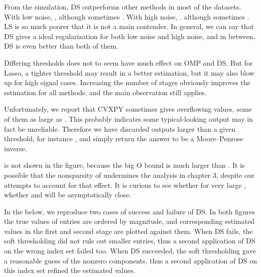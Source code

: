 \stopsubsection

\startsubsection [title={Discussion}]

From the simulation, DS outperforms other methods in most of the datasets.
With low noise, ,
although sometimes .
With high noise, .
although sometimes .
LS is so much poorer that it is not a main contender.
In general, we can say that DS gives a ideal regularization for both low noise and high noise, and in between, DS is even better than both of them.

Differing thresholds does not to seem have much effect on OMP and DS.
But for Lasso, a tighter threshold may result in a better estimation, but it may also blow up for high signal cases.
Increasing the number of stages obviously improves the estimation for all methods, and the main observation still applies.

Unfortunately, we report that CVXPY sometimes gives overflowing values, some of them as large as .
This probably indicates some typical-looking output may in fact be unreliable.
Therefore we have discarded outputs larger than a given threshold, for instance , and simply return the answer to be a Moore–Penrose inverse.

\m {\chi} is not shown in the figure, because the big O bound is much larger than \m {\T {\chi}}.
It is possible that the nonsparsity of  undermines the analysis in chapter 3, despite our attempts to account for that effect.
It is curious to see whether for very large , whether \m {\T {\chi}} and \m {\chi} will be asymptotically close.

In the below, we reproduce two cases of success and failure of DS.
In both figures the true values of  entries are ordered by magnitude, and corresponding estimated values in the first and second stage are plotted against them.
When DS fails, the soft thresholding did not rule out smaller entries, thus a second application of DS on the wrong index set failed too.
When DS succeeded, the soft thresholding gave a reasonable guess of the nonzero components, thus a second application of DS on this index set refined the estimated values.

\blank [big]
\blank [big]

